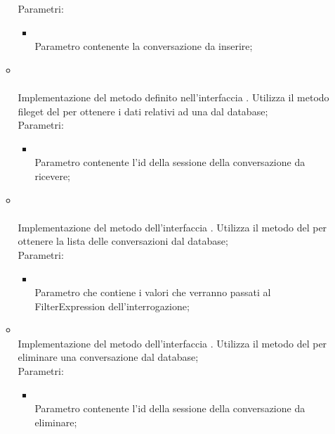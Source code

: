 \begin{itemize}
\begin{itemize}
		Parametri:
		\begin{itemize}
			\item {} \\
			Parametro contenente la conversazione da inserire;
		\end{itemize}
		\item[]  \\\\		Implementazione del metodo definito nell'interfaccia . Utilizza il metodo file{get} del  per ottenere i dati relativi ad una  dal database;\\
		Parametri:
		\begin{itemize}
			\item {} \\
			Parametro contenente l'id della sessione della conversazione da ricevere;
		\end{itemize}
		\item[] \\ \\		Implementazione del metodo dell'interfaccia . Utilizza il metodo  del  per ottenere la lista delle conversazioni dal database;\\
		Parametri:
		\begin{itemize}
			\item {} \\
			Parametro che contiene i valori che verranno passati al FilterExpression dell'interrogazione;
		\end{itemize}
		\item[]  \\		Implementazione del metodo dell'interfaccia . Utilizza il metodo  del  per eliminare una conversazione dal database;\\
		Parametri:
		\begin{itemize}
			\item {} \\
			Parametro contenente l'id della sessione della conversazione da eliminare;
		\end{itemize}

\end{itemize}
\end{itemize}
